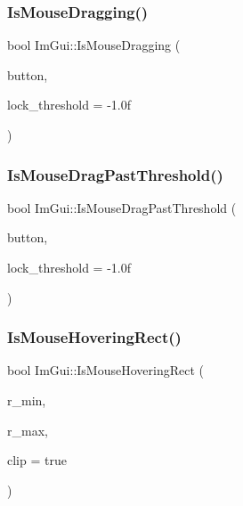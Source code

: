 \subsubsection{\texorpdfstring{Is\+Mouse\+Dragging()}{IsMouseDragging()}}
{\footnotesize\ttfamily bool Im\+Gui\+::\+Is\+Mouse\+Dragging (\begin{DoxyParamCaption}\item[{Im\+Gui\+Mouse\+Button}]{button,  }\item[{float}]{lock\+\_\+threshold = {\ttfamily -\/1.0f} }\end{DoxyParamCaption})}

\mbox{\label{namespaceImGui_ad1b3473eaad344022a022acfd45b0f5c}} 
\subsubsection{\texorpdfstring{Is\+Mouse\+Drag\+Past\+Threshold()}{IsMouseDragPastThreshold()}}
{\footnotesize\ttfamily bool Im\+Gui\+::\+Is\+Mouse\+Drag\+Past\+Threshold (\begin{DoxyParamCaption}\item[{Im\+Gui\+Mouse\+Button}]{button,  }\item[{float}]{lock\+\_\+threshold = {\ttfamily -\/1.0f} }\end{DoxyParamCaption})}

\mbox{\label{namespaceImGui_ae0b8ea0e06c457316d6aed6c5b2a1c25}} 
\subsubsection{\texorpdfstring{Is\+Mouse\+Hovering\+Rect()}{IsMouseHoveringRect()}}
{\footnotesize\ttfamily bool Im\+Gui\+::\+Is\+Mouse\+Hovering\+Rect (\begin{DoxyParamCaption}\item[{const \hyperlink{structImVec2}{Im\+Vec2} \&}]{r\+\_\+min,  }\item[{const \hyperlink{structImVec2}{Im\+Vec2} \&}]{r\+\_\+max,  }\item[{bool}]{clip = {\ttfamily true} }\end{DoxyParamCaption})}

